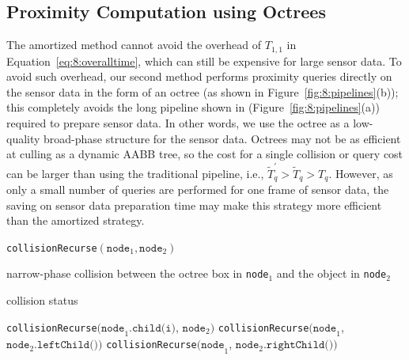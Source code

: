\subsection{Proximity Computation using Octrees}
The amortized method cannot avoid the overhead of $T_{1,1}$ in Equation~\ref{eq:8:overalltime}, which can still be expensive for large sensor data.
To avoid such overhead, our second method
performs proximity queries directly on the sensor data in
the form of an octree (as shown in Figure~\ref{fig:8:pipelines}(b)); this completely avoids the long pipeline shown in (Figure~\ref{fig:8:pipelines}(a)) required to prepare sensor
data. In other words, we use the octree as a low-quality broad-phase
structure for the sensor data. Octrees may not be as efficient at
culling as a dynamic AABB tree, so the cost for a single collision or
query cost can be larger than using the traditional pipeline, i.e.,
$\widetilde{T}_q^\prime > \widetilde{T}_q > T_q$. However, as
only a small number of queries are performed for one frame of sensor
data, the saving on sensor data preparation time may make this
strategy more efficient than the amortized strategy.




\begin{algorithm}[htb]
	\caption{\texttt{collisionRecurse}$(\texttt{node}_1, \texttt{node}_2)$}
	\label{algo:collision_recurse}
	\begin{algorithmic}[1]
                \STATE narrow-phase collision between the octree box in \texttt{node}$_1$ and the object in \texttt{node}$_2$
           \ENDIF

           \RETURN collision status
      \ENDIF

                   \STATE  \texttt{collisionRecurse}$\texttt{(node}_1.\texttt{child(i)}$, $\texttt{node}_2\texttt{)}$
                \ENDIF
              \ENDFOR
            \ELSE
              \STATE \texttt{collisionRecurse}$\texttt{(node}_1$, $\texttt{node}_2.\texttt{leftChild())}$
              \STATE \texttt{collisionRecurse}$\texttt{(node}_1$, $\texttt{node}_2.\texttt{rightChild())}$

            \ENDIF
\end{algorithmic}
\end{algorithm}



